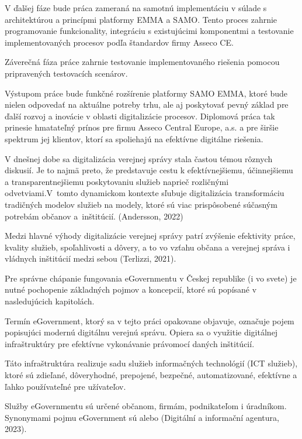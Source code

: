 V ďalšej fáze bude práca zameraná na samotnú implementáciu v súlade s architektúrou a princípmi platformy EMMA a SAMO. Tento proces zahrnie programovanie funkcionality, integráciu s existujúcimi komponentmi a testovanie implementovaných procesov podľa štandardov firmy Asseco CE.

Záverečná fáza práce zahrnie testovanie implementovaného riešenia pomocou pripravených testovacích scenárov.

Výstupom práce bude funkčné rozšírenie platformy SAMO EMMA, ktoré bude nielen odpovedať na aktuálne potreby trhu, ale aj poskytovať pevný základ pre ďalší rozvoj a inovácie v oblasti digitalizácie procesov. Diplomová práca tak prinesie hmatateľný prínos pre firmu Asseco Central Europe, a.s. a pre širšie spektrum jej klientov, ktorí sa spoliehajú na efektívne digitálne riešenia.


V dnešnej dobe sa digitalizácia verejnej správy stala častou témou rôznych diskusií. Je to najmä preto, že predstavuje cestu k efektívnejšiemu, účinnejšiemu a transparentnejšiemu poskytovaniu služieb naprieč rozličnými odvetviami.\zlom V~tomto dynamickom kontexte sľubuje digitalizácia transformáciu tradičných modelov služieb na modely, ktoré sú viac prispôsobené súčasným potrebám občanov a~inštitúcií. \scr(Andersson, 2022)

Medzi hlavné výhody digitalizácie verejnej správy patrí zvýšenie efektivity práce, kvality služieb, spoľahlivosti a dôvery, a to vo vzťahu občana a verejnej správa i vládnych inštitúcií medzi sebou \scr(Terlizzi, 2021).

Pre správne chápanie fungovania eGovernmentu v Českej republike (i vo svete) je nutné pochopenie základných pojmov a koncepcií, ktoré sú popísané v nasledujúcich kapitolách.

Termín eGovernment,  ktorý sa v tejto práci opakovane objavuje, označuje pojem popisujúci modernú digitálnu verejnú správu. Opiera sa o využitie digitálnej infraštruktúry pre efektívne vykonávanie právomocí daných inštitúcií. 

Táto infraštruktúra realizuje sadu služieb informačných technológií (ICT služieb), ktoré sú zdieľané, dôveryhodné, prepojené, bezpečné, automatizované, efektívne a ľahko používateľné pre užívateľov. 

Služby eGovernmentu sú určené občanom, firmám, podnikateľom i úradníkom. Synonymami pojmu eGovernment sú  alebo  \scr(Digitální a informační agentura, 2023).

